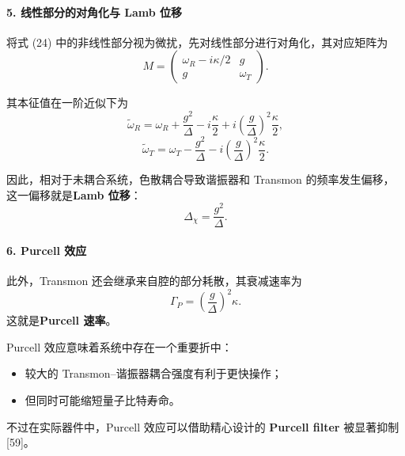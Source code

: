 \documentclass[12pt,a4paper,oneside]{ctexbook}
\begin{document}
\paragraph{5. 线性部分的对角化与 Lamb 位移}

将式 (24) 中的非线性部分视为微扰，先对线性部分进行对角化，其对应矩阵为
\begin{equation}
    M=
    \begin{pmatrix}
        \omega_R-i\kappa/2 & g\\
        g & \omega_T
    \end{pmatrix}.
    \tag{25}
\end{equation}

其本征值在一阶近似下为
\begin{equation}
    \tilde\omega_R
    =
    \omega_R+\frac{g^2}{\Delta}
    -i\frac{\kappa}{2}
    +i\left(\frac{g}{\Delta}\right)^2\frac{\kappa}{2},
    \tag{26}
\end{equation}
\begin{equation}
    \tilde\omega_T
    =
    \omega_T-\frac{g^2}{\Delta}
    -i\left(\frac{g}{\Delta}\right)^2\frac{\kappa}{2}.
    \tag{27}
\end{equation}

因此，相对于未耦合系统，色散耦合导致谐振器和 Transmon 的频率发生偏移，这一偏移就是\textbf{Lamb 位移}：
\begin{equation}
    \Delta_\chi=\frac{g^2}{\Delta}.
    \tag{28}
\end{equation}

\paragraph{6. Purcell 效应}

此外，Transmon 还会继承来自腔的部分耗散，其衰减速率为
\begin{equation}
    \Gamma_P=\left(\frac{g}{\Delta}\right)^2\kappa.
    \tag{29}
\end{equation}
这就是\textbf{Purcell 速率}。

Purcell 效应意味着系统中存在一个重要折中：
\begin{itemize}[leftmargin=2em]
    \item 较大的 Transmon--谐振器耦合强度有利于更快操作；
    \item 但同时可能缩短量子比特寿命。
\end{itemize}

不过在实际器件中，Purcell 效应可以借助精心设计的 \textbf{Purcell filter} 被显著抑制 [59]。
\end{document}
